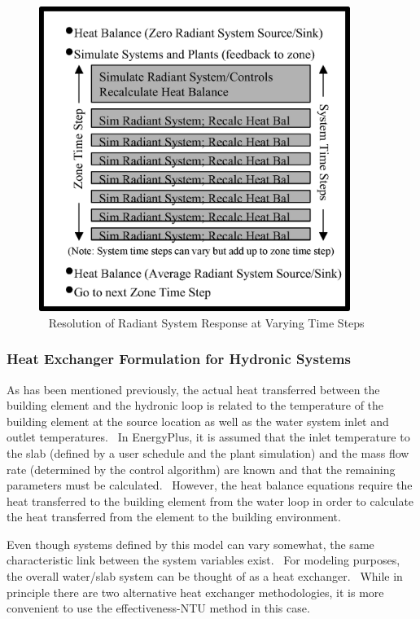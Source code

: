 \begin{figure}[hbtp] %
\centering
\includegraphics[width=0.9\textwidth, height=0.9\textheight, keepaspectratio=true]{media/image6056.png}
\caption{  Resolution of Radiant System Response at Varying Time Steps \protect \label{fig:resolution-of-radiant-system-response-at}}
\end{figure}

\subsubsection{Heat Exchanger Formulation for Hydronic Systems}\label{heat-exchanger-formulation-for-hydronic-systems}

As has been mentioned previously, the actual heat transferred between the building element and the hydronic loop is related to the temperature of the building element at the source location as well as the water system inlet and outlet temperatures.~ In EnergyPlus, it is assumed that the inlet temperature to the slab (defined by a user schedule and the plant simulation) and the mass flow rate (determined by the control algorithm) are known and that the remaining parameters must be calculated.~ However, the heat balance equations require the heat transferred to the building element from the water loop in order to calculate the heat transferred from the element to the building environment.

Even though systems defined by this model can vary somewhat, the same characteristic link between the system variables exist.~ For modeling purposes, the overall water/slab system can be thought of as a heat exchanger.~ While in principle there are two alternative heat exchanger methodologies, it is more convenient to use the effectiveness-NTU method in this case.

